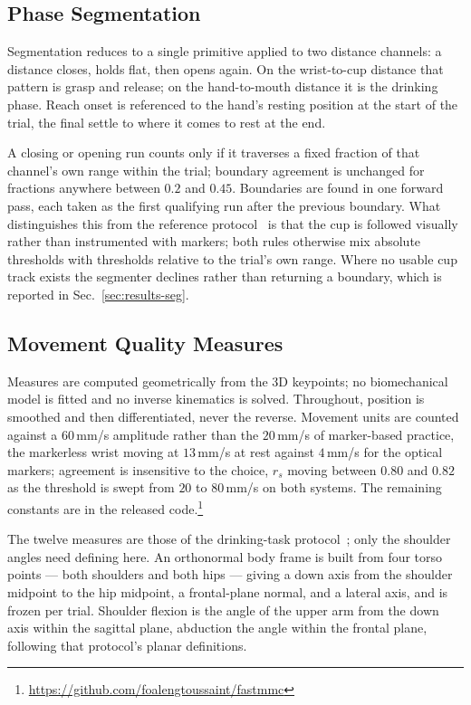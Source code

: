 \documentclass[conference]{IEEEtran}
\begin{document}
\subsection{Phase Segmentation}
\label{sec:phases}
Segmentation reduces to a single primitive applied to two distance channels: a distance closes, holds flat, then
opens again. On the wrist-to-cup distance that pattern is grasp and release; on
the hand-to-mouth distance it is the drinking phase. Reach onset is referenced
to the hand's resting position at the start of the trial, the final settle to
where it comes to rest at the end.

A closing or opening run counts only if it traverses a fixed fraction of that
channel's own range within the trial; boundary agreement is unchanged for
fractions anywhere between $0.2$ and $0.45$. Boundaries are found in one forward pass,
each taken as the first qualifying run after the previous boundary. What
distinguishes this from the reference protocol~\cite{altmurphy2018} is that the
cup is followed visually rather than instrumented with markers; both rules
otherwise mix absolute thresholds with thresholds relative to the trial's own
range. Where no
usable cup track exists the segmenter declines rather than returning a boundary,
which is reported in Sec.~\ref{sec:results-seg}.

\subsection{Movement Quality Measures}
\label{sec:measures}
Measures are computed geometrically from the 3D keypoints; no biomechanical
model is fitted and no inverse kinematics is solved. Throughout, position is
smoothed and then differentiated, never the reverse. Movement units are counted
against a $60$\,mm/s amplitude rather than the $20$\,mm/s of marker-based
practice, the markerless wrist moving at $13$\,mm/s at rest against $4$\,mm/s
for the optical markers; agreement is insensitive to the choice, $r_s$ moving
between $0.80$ and $0.82$ as the threshold is swept from $20$ to $80$\,mm/s on
both systems. The remaining
constants are in the released code.\footnote{\url{https://github.com/foalengtoussaint/fastmmc}}

The twelve measures are those of the drinking-task protocol~\cite{altmurphy2018};
only the shoulder angles need defining here. An orthonormal body frame is built
from four torso points --- both shoulders and both hips --- giving a down axis
from the shoulder midpoint to the hip midpoint, a frontal-plane normal, and a
lateral axis, and is frozen per trial. Shoulder flexion is the angle of the
upper arm from the down axis within the sagittal plane, abduction the angle
within the frontal plane, following that protocol's planar definitions.
\end{document}
